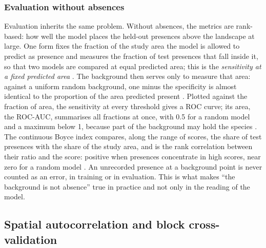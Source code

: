 \subsubsection*{Evaluation without absences}

Evaluation inherits the same problem. Without absences, the metrics
are rank-based: how well the
model places the held-out presences above the landscape at large. One
form fixes the fraction of the study area the model is allowed to
predict as presence and measures the fraction of test presences that
fall inside it, so that two models are compared at equal predicted
area; this is the \emph{sensitivity at a fixed predicted area}
\cite{phillips2006,peterson2008}. The background then serves only
to measure that area: against a uniform random background, one minus
the specificity is almost identical to the proportion of the area
predicted present \cite{phillips2006}. Plotted against the fraction of
area, the sensitivity at every threshold gives a ROC curve; its area,
the ROC-AUC, summarises all fractions at once, with 0.5 for a random
model and a maximum below 1, because part of the background may hold
the species \cite{phillips2006}. The continuous Boyce index compares,
along the range of scores, the share of test presences with the share
of the study area, and is the rank correlation between their ratio and
the score: positive when presences concentrate in high scores, near
zero for a random model \cite{hirzel2006}. An unrecorded presence at a
background point is never counted as an error, in training or in
evaluation. This is what makes ``the background is not absence'' true
in practice and not only in the reading of the model.

\subsection{Spatial autocorrelation and block cross-validation}
\label{sec:background-po-spatial}

